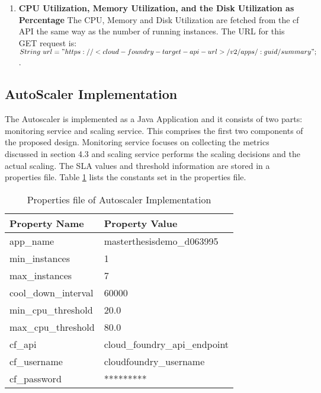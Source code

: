 \documentclass[article,type=msc,colorback,12pt,accentcolor=tud8b,table]{tudthesis}
\begin{document}
\begin{enumerate}
	\item\textbf{{CPU Utilization, Memory Utilization, and the Disk Utilization as Percentage}} 
	 The CPU, Memory and Disk Utilization are fetched from the \gls{cf} API the same way as the number of running instances. The URL for this GET request is:  \newline
	$ String\ url = "https://<cloud-foundry-target-api-url>/v2/apps/:guid/summary"; $. 
	
\end{enumerate}	
	
	\subsection{AutoScaler Implementation} 
	
	The Autoscaler is implemented as a Java Application and it consists of two parts: monitoring service and scaling service. This comprises the first two components of the proposed design. Monitoring service focuses on collecting the metrics discussed in section 4.3 and scaling service performs the scaling decisions and the actual scaling. The SLA values and threshold information are stored in a properties file. Table \ref{tab:as_properties} lists the constants set in the properties file. 
	
	\begin{table}[H]
		\centering
		\caption{Properties file of Autoscaler Implementation}
		\label{tab:as_properties}
		\begin{tabular}{|l|l|}
			\hline
			\rowcolor[HTML]{EC6500} 
			Property Name        & Property Value                \\ \hline
			app\_name            & masterthesisdemo\_d063995     \\ \hline
			min\_instances       & 1                             \\ \hline
			max\_instances       & 7                             \\ \hline
			cool\_down\_interval & 60000                         \\ \hline
			min\_cpu\_threshold  & 20.0                          \\ \hline
			max\_cpu\_threshold  & 80.0                          \\ \hline
			cf\_api              & cloud\_foundry\_api\_endpoint \\ \hline
			cf\_username         & cloudfoundry\_username           \\ \hline
			cf\_password         & *********                     \\ \hline
		\end{tabular}
	\end{table}
	
\end{document}
